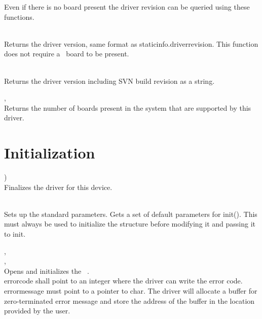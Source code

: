 	Even if there is no board present the driver revision can be queried using these functions.

	\\
	Returns the driver version, same format as \textsf{\prefix static\tu info.driver\tu revision}. 
	This function does not require a \deviceName\ board to be present.

	\\
	Returns the driver version including SVN build revision as a string. 

	, \\
	\label{countdevices}
	Returns the number of boards present in the system that are supported by this driver.\par


\section {Initialization}

		\device )\\
		Finalizes the driver for this device.

		\\
		Sets up the standard parameters. Gets a set of default parameters for \textsf{\prefix init()}. 
		This must always be used to initialize the \textsf{\initparameters} structure before modifying it 
		and passing it to \textsf{\prefix init}.\par

		, \\ 
		, \\
		Opens and initializes the \deviceName\ 
		. \\
		\textsf{error\tu code} shall point to an integer where the driver can write the error code. \\
		\textsf{error\tu message} must point to a pointer to char. 
		The driver will allocate a buffer for zero-terminated error message and store the address of the buffer in the location provided by the user.\par

